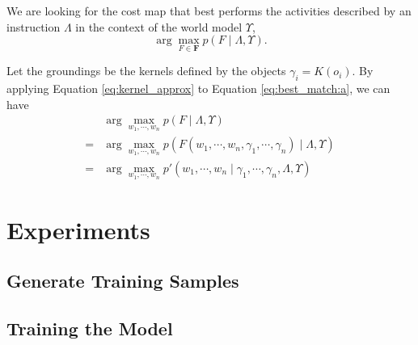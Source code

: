 \documentclass[10pt,a4paper]{article}
\begin{document}
We are looking for the cost map that best performs the activities described by an instruction $ \Lambda $ in the context of the world model $ \Upsilon $,
\begin{equation}
\label{eq:best_match:a}
\arg \max_{ F \in \bm{F} } p( F \mid \Lambda , \Upsilon ).
\end{equation}

Let the groundings be the kernels defined by the objects
$ \gamma_i = K( o_i ) $.
By applying Equation \eqref{eq:kernel_approx} to Equation \eqref{eq:best_match:a}, we can have
\begin{equation}
\label{eq:best_match:b}
\begin{aligned}
& \arg \max_{ w_1 , \cdots , w_n } p( F \mid \Lambda, \Upsilon ) \\
= & \arg \max_{ w_1 , \cdots , w_n } p( F( w_1 , \cdots , w_n , \gamma_1 , \cdots, \gamma_n ) \mid \Lambda, \Upsilon ) \\
= & \arg \max_{ w_1 , \cdots , w_n } p'( w_1 , \cdots , w_n \mid \gamma_1 , \cdots, \gamma_n, \Lambda, \Upsilon )
\end{aligned}
\end{equation}

\section{Experiments}

\subsection{Generate Training Samples}


\subsection{Training the Model}



 	

	
\end{document}
